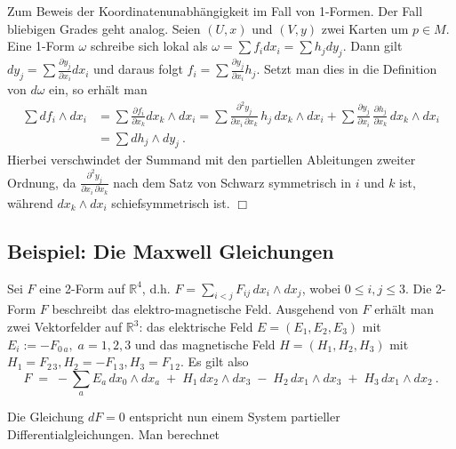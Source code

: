 \documentclass[12pt,a4paper]{article}
\def\R{\mathbb{R}}
\def\qed{\quad\hfill\ensuremath{\Box}}
\begin{document}
Zum Beweis der Koordinatenunabh\"angigkeit im Fall von 1-Formen. Der Fall bliebigen Grades geht
analog. Seien $(U,x)$ und $(V,y)$ zwei Karten um $p\in M$. Eine 1-Form $\omega$ schreibe sich
lokal als $\omega = \sum f_i dx_i = \sum h_j dy_j$. Dann gilt $dy_j = \sum
\frac{\partial y_j}{\partial x_i}dx_i$ und daraus folgt $f_i = \sum \frac{\partial y_j}{\partial x_i} h_j$.
Setzt man dies in die Definition von $d\omega$ ein, so erh\"alt man
$$
\begin{array}{rl}
\sum df_i \wedge dx_i & = \sum \tfrac{\partial f_i}{\partial x_k } dx_k \wedge dx_i =
\sum \tfrac{\partial^2 y_j}{\partial x_i \, \partial x_k} \, h_j \, dx_k \wedge dx_i
+
\sum \tfrac{\partial y_j }{\partial x_i}\,\tfrac{\partial h_j }{\partial x_k}\,dx_k \wedge dx_i \\[1.5ex]
& =
\sum dh_j \wedge dy_j \ .
\end{array}
$$
Hierbei verschwindet der Summand mit den partiellen Ableitungen zweiter Ordnung, da
$\tfrac{\partial^2 y_j}{\partial x_i \, \partial x_k}$ nach dem Satz von Schwarz
symmetrisch in $i$ und $k$ ist, w\"ahrend $dx_k \wedge dx_i$ schiefsymmetrisch ist.
\qed






\bigskip

\subsection{Beispiel: Die Maxwell Gleichungen}

\bigskip

Sei $F$ eine 2-Form auf $\R^4$, d.h. $F= \sum_{i<j } F_{ij} \, dx_i \wedge dx_j$, wobei $0\le i,j \le 3$.
Die 2-Form $F$ beschreibt das elektro-magnetische Feld. Ausgehend von $F$ erh\"alt man zwei Vektorfelder
auf $\R^3$: das elektrische Feld $E = (E_1, E_2, E_3)$ mit $E_i :=-F_{0\,a},\; a=1,2,3$ und das magnetische
Feld $H =(H_1, H_2, H_3)$ mit $H_1 = F_{2\,3}, H_2 = -F_{1\,3}, H_3 = F_{1\,2}$. Es gilt also
$$
F \;=\; - \sum_a E_a \, dx_0 \wedge dx_a \;+\; H_1 \, dx_2 \wedge dx_3 \;-\; H_2 \, dx_1 \wedge dx_3 \;+\; H_3 \, dx_1 \wedge dx_2 \ .
$$

\medskip

Die Gleichung $dF = 0$ entspricht nun einem System partieller Differentialgleichungen. Man berechnet
\end{document}
